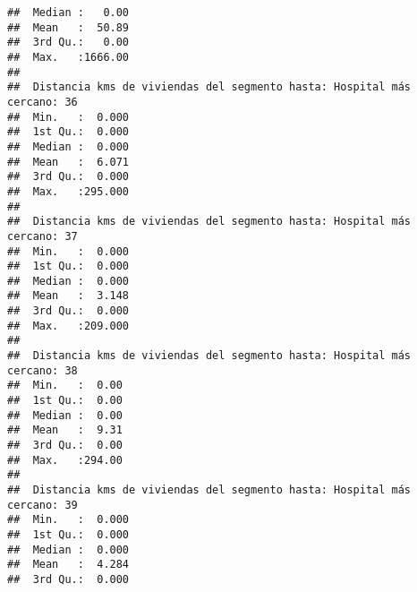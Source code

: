 \documentclass[11pt,]{article}
\begin{document}
\begin{verbatim}
##  Median :   0.00                                                        
##  Mean   :  50.89                                                        
##  3rd Qu.:   0.00                                                        
##  Max.   :1666.00                                                        
##                                                                         
##  Distancia kms de viviendas del segmento hasta: Hospital más cercano: 36
##  Min.   :  0.000                                                        
##  1st Qu.:  0.000                                                        
##  Median :  0.000                                                        
##  Mean   :  6.071                                                        
##  3rd Qu.:  0.000                                                        
##  Max.   :295.000                                                        
##                                                                         
##  Distancia kms de viviendas del segmento hasta: Hospital más cercano: 37
##  Min.   :  0.000                                                        
##  1st Qu.:  0.000                                                        
##  Median :  0.000                                                        
##  Mean   :  3.148                                                        
##  3rd Qu.:  0.000                                                        
##  Max.   :209.000                                                        
##                                                                         
##  Distancia kms de viviendas del segmento hasta: Hospital más cercano: 38
##  Min.   :  0.00                                                         
##  1st Qu.:  0.00                                                         
##  Median :  0.00                                                         
##  Mean   :  9.31                                                         
##  3rd Qu.:  0.00                                                         
##  Max.   :294.00                                                         
##                                                                         
##  Distancia kms de viviendas del segmento hasta: Hospital más cercano: 39
##  Min.   :  0.000                                                        
##  1st Qu.:  0.000                                                        
##  Median :  0.000                                                        
##  Mean   :  4.284                                                        
##  3rd Qu.:  0.000                                                        

\end{verbatim}
\end{document}
